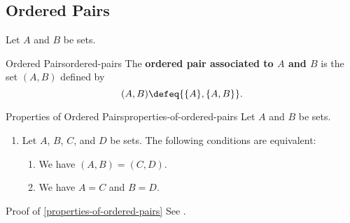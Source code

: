 \subsection{Ordered Pairs}\label{subsection-ordered-pairs}
Let $A$ and $B$ be sets.%
\begin{definition}{Ordered Pairs}{ordered-pairs}%
    The \textbf{ordered pair associated to $A$ and $B$} is the set $(A,B)$ defined by%
    \[
        (A,B)%
        \defeq%
        \{\{A\},\{A,B\}\}.%
    \]%
\end{definition}
\begin{proposition}{Properties of Ordered Pairs}{properties-of-ordered-pairs}%
    Let $A$ and $B$ be sets.%
    \begin{enumerate}
        \item\label{properties-of-ordered-pairs-uniqueness}Let $A$, $B$, $C$, and $D$ be sets. The following conditions are equivalent:
            \begin{enumerate}
                \item\label{properties-of-ordered-pairs-uniqueness-a}We have $(A,B)=(C,D)$.
                \item\label{properties-of-ordered-pairs-uniqueness-b}We have $A=C$ and $B=D$.
            \end{enumerate}
    \end{enumerate}
\end{proposition}
\begin{Proof}{Proof of \cref{properties-of-ordered-pairs}}%
    See \cite[Theorem 1.2.3]{ciesielski1997set}.
\end{Proof}
